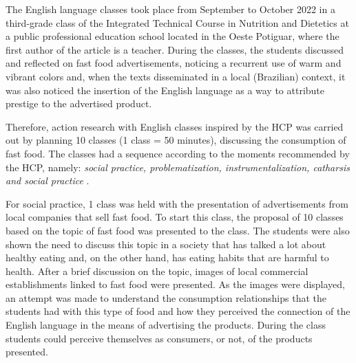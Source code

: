\documentclass[english]{textolivre}
\begin{document}
The English language classes took place from September to October 2022 in a third-grade class of the Integrated Technical Course in Nutrition and Dietetics at a public professional education school located in the Oeste Potiguar, where the first author of the article is a teacher. During the classes, the students discussed and reflected on fast food advertisements, noticing a recurrent use of warm and vibrant colors and, when the texts disseminated in a local (Brazilian) context, it was also noticed the insertion of the English language as a way to attribute prestige to the advertised product.

Therefore, action research with English classes inspired by the HCP was carried out by planning 10 classes (1 class = 50 minutes), discussing the consumption of fast food. The classes had a sequence according to the moments recommended by the HCP, namely: \emph{social practice, problematization, instrumentalization, catharsis and social practice} \cite{saviani_pedagogia_2019}.

For social practice, 1 class was held with the presentation of advertisements from local companies that sell fast food. To start this class, the proposal of 10 classes based on the topic of fast food was presented to the class. The students were also shown the need to discuss this topic in a society that has talked a lot about healthy eating and, on the other hand, has eating habits that are harmful to health. After a brief discussion on the topic, images of local commercial establishments linked to fast food were presented. As the images were displayed, an attempt was made to understand the consumption relationships that the students had with this type of food and how they perceived the connection of the English language in the means of advertising the products. During the class students could perceive themselves as consumers, or not, of the products presented.
\end{document}
